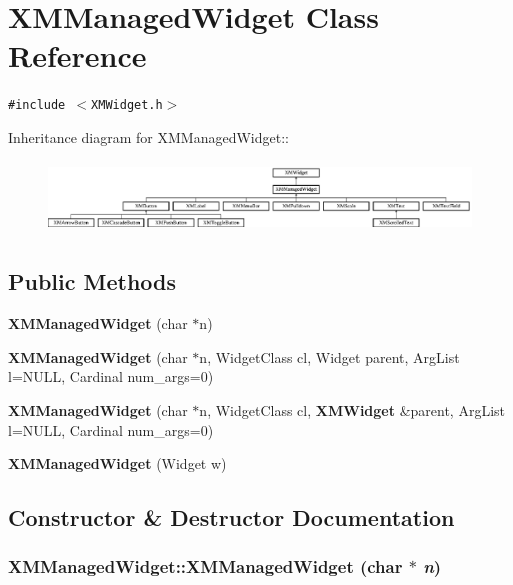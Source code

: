 \section{XMManaged\-Widget  Class Reference}
\label{classXMManagedWidget}
{\tt \#include $<$XMWidget.h$>$}

Inheritance diagram for XMManaged\-Widget::\begin{figure}[H]
\begin{center}
\leavevmode
\includegraphics[height=1.89992cm]{classXMManagedWidget}
\end{center}
\end{figure}
\subsection*{Public Methods}
\begin{CompactItemize}
\item 
{\bf XMManaged\-Widget} (char $\ast$n)
\item 
{\bf XMManaged\-Widget} (char $\ast$n, Widget\-Class cl, Widget parent, Arg\-List l=NULL, Cardinal num\_\-args=0)
\item 
{\bf XMManaged\-Widget} (char $\ast$n, Widget\-Class cl, {\bf XMWidget} \&parent, Arg\-List l=NULL, Cardinal num\_\-args=0)
\item 
{\bf XMManaged\-Widget} (Widget w)
\end{CompactItemize}


\subsection{Constructor \& Destructor Documentation}
\subsubsection{\setlength{\rightskip}{0pt plus 5cm}XMManaged\-Widget::XMManaged\-Widget (char $\ast$ {\em n})\hspace{0.3cm}{\tt  [inline]}}\label{classXMManagedWidget_a0}




